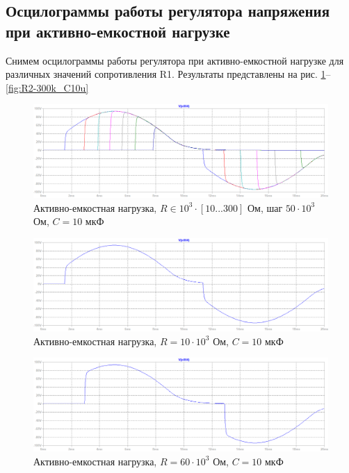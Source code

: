 \documentclass[a4paper, 12pt]{article}
\begin{document}
    \subsection{Осцилограммы работы регулятора напряжения при активно-емкостной нагрузке}
    Снимем осцилограммы работы регулятора при активно-емкостной нагрузке 
    для различных значений сопротивления R1. Результаты представлены на рис. \ref{fig:R2-all_C10u}--\ref{fig:R2-300k_C10u}
    \begin{figure}[H]
        \centering
        \includegraphics[scale=0.45]{R2-all_C10u.png}
        \captionsetup{skip=0pt}
        \caption{Активно-емкостная нагрузка, $R\in10^3\cdot\left[ 10...300 \right]$ Ом, шаг $50\cdot10^3$ Ом, $C=10$ мкФ}
        \label{fig:R2-all_C10u}
    \end{figure}
    \begin{figure}[H]
        \centering
        \includegraphics[scale=0.45]{R2-10k_C10u.png}
        \captionsetup{skip=0pt}
        \caption{Активно-емкостная нагрузка, $R=10\cdot10^3$ Ом, $C=10$ мкФ}
        \label{fig:R2-10k_C10u}
    \end{figure}
    \begin{figure}[H]
        \centering
        \includegraphics[scale=0.45]{R2-60k_C10u.png}
        \captionsetup{skip=0pt}
        \caption{Активно-емкостная нагрузка, $R=60\cdot10^3$ Ом, $C=10$ мкФ}
        \label{fig:R2-60k_C10u}
    \end{figure}
\end{document}
